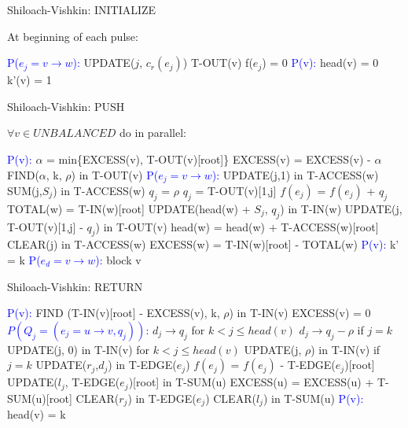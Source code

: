 \documentclass[a4paper,10pt, twocolumn]{article}
\begin{document}
\begin{algorithm}
\caption{Shiloach-Vishkin: INITIALIZE}
\label{algo:sv_init}
At beginning of each pulse:	
\begin{algorithmic}[1]
		\State \textcolor{blue}{P($e_j = v \rightarrow w$):}
		\State UPDATE($j$, $c_r(e_j)$) T-OUT(v)
		\State f($e_j$) = 0
		\State \textcolor{blue}{P(v):}
		\State head(v) = 0	
		\State k'(v) = 1	
 	\EndFunction
\end{algorithmic}
\end{algorithm}

\begin{algorithm}
\caption{Shiloach-Vishkin: PUSH}
\label{algo:sv_push}
$\forall v \in UNBALANCED$ do in parallel:
\begin{algorithmic}[1]
		\State \textcolor{blue}{P(v):}
		\State $\alpha$ = min\{EXCESS(v), T-OUT(v)[root]\} 
		\State EXCESS(v) = EXCESS(v) - $\alpha$
		\State FIND($\alpha$, k, $\rho$) in T-OUT(v)
		\State \textcolor{blue}{P($e_j = v \rightarrow w$):}
 		\State UPDATE(j,1) in T-ACCESS(w)
		\State SUM(j,$S_j$) in T-ACCESS(w)
			$q_j$ = $\rho$
		\Else
			\State $q_j$ = T-OUT(v)[1,j]
		\EndIf
		\State $f(e_j)$ = $f(e_j)$ + $q_j$
		\State TOTAL(w) = T-IN(w)[root]
		\State UPDATE(head(w) + $S_j$, $q_j$) in T-IN(w)
		\State UPDATE(j, T-OUT(v)[1,j] - $q_j$) in T-OUT(v)
		\State head(w) = head(w) + T-ACCESS(w)[root] 
		\State CLEAR(j) in T-ACCESS(w)
		\State EXCESS(w) = T-IN(w)[root] - TOTAL(w)
		\EndIf
		\State \textcolor{blue}{P(v):} k' = k
		\State \textcolor{blue}{P($e_d = v \rightarrow w$):}
			\State block v
		\EndIf
 	\EndFunction
\end{algorithmic}
\end{algorithm}


\begin{algorithm}
\caption{Shiloach-Vishkin: RETURN}
\label{algo:sv_return}
\begin{algorithmic}[1]
		\State \textcolor{blue}{P(v):}
		\State FIND (T-IN(v)[root] - EXCESS(v), k, $\rho$) in T-IN(v)
		\State EXCESS(v) = 0
		\State \textcolor{blue}{$P(Q_j = (e_j = u \rightarrow v, q_j))$:}
		\State $d_j \rightarrow q_j$ for $k < j \leq head(v)$
		\State $d_j \rightarrow q_j - \rho$ if $j = k$
		\State UPDATE(j, 0) in T-IN(v) for $k < j \leq head(v)$
		\State UPDATE(j, $\rho$) in T-IN(v) if $j = k$
		\State UPDATE($r_j$,$d_j$) in T-EDGE($e_j$)
		\State $f(e_j)$ = $f(e_j)$ - T-EDGE($e_j$)[root]
		\State UPDATE($l_j$, T-EDGE($e_j$)[root] in T-SUM(u)
		\State EXCESS(u) = EXCESS(u) + T-SUM(u)[root]
		\State CLEAR($r_j$) in T-EDGE($e_j$)
		\State CLEAR($l_j$) in T-SUM(u)
		\State \textcolor{blue}{P(v):}
		\State head(v) = k
	\EndFunction
\end{algorithmic}
\end{algorithm}
\end{document}
